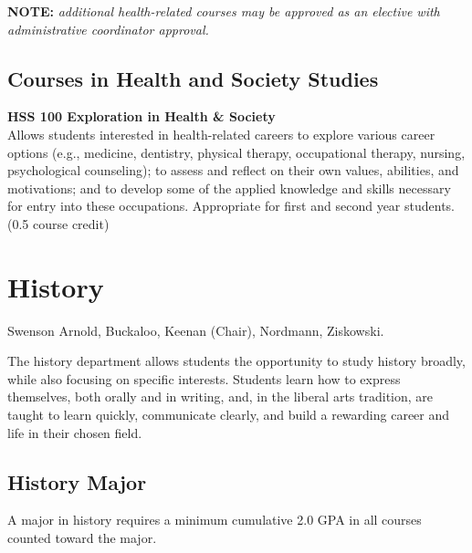 \documentclass[
  letterpaper,
]{scrbook}
\begin{document}
\textbf{NOTE:} \emph{additional health-related courses may be approved
as an elective with administrative coordinator approval.}

\subsection{Courses in Health and Society
Studies}\label{courses-in-health-and-society-studies}

\textbf{HSS 100 Exploration in Health \& Society}\\
Allows students interested in health-related careers to explore various
career options (e.g., medicine, dentistry, physical therapy,
occupational therapy, nursing, psychological counseling); to assess and
reflect on their own values, abilities, and motivations; and to develop
some of the applied knowledge and skills necessary for entry into these
occupations. Appropriate for first and second year students. (0.5 course
credit)

\section{History}\label{sec-history}

Swenson Arnold, Buckaloo, Keenan (Chair), Nordmann, Ziskowski.

The history department allows students the opportunity to study history
broadly, while also focusing on specific interests. Students learn how
to express themselves, both orally and in writing, and, in the liberal
arts tradition, are taught to learn quickly, communicate clearly, and
build a rewarding career and life in their chosen field.

\subsection{History Major}\label{history-major}

A major in history requires a minimum cumulative 2.0 GPA in all courses
counted toward the major.
\end{document}
